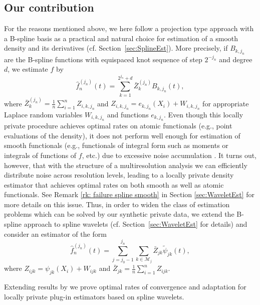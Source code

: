\documentclass[preprint]{imsart}
\numberwithin{equation}{section}
\begin{document}
\subsection{Our contribution}

For the reasons mentioned above, we here follow a projection type approach with a B-spline basis as a practical and natural choice for estimation of a smooth density and its derivatives (cf. Section~\ref{sec:SplineEst}). More precisely, if $B_{k,j_n}$ are the B-spline functions with equispaced knot sequence of step $2^{-j_n}$ and degree $d$, we estimate $f$ by
\begin{equation}\label{eq:B-splineEst}
\hat{f}_n^{(j_n)}(t) = \sum_{k=1}^{2^{j_n}+d} \bar{Z}_k^{(j_n)} B_{k,j_n}(t),
\end{equation}
where $\bar{Z}_k^{(j_n)} = \frac1n\sum_{i=1}^n Z_{i,k,j_n}$ and $Z_{i,k,j_n} = e_{k,j_n}(X_i) + W_{i,k,j_n}$ for appropriate Laplace random variables $W_{i,k,j_n}$ and functions $e_{k,j_n}$. Even though this locally private procedure achieves optimal rates on atomic functionals (e.g., point evaluations of the density), it does not perform well enough for estimation of smooth functionals (e.g., functionals of integral form such as moments or integrals of functions of $f$, etc.) due to excessive noise accumulation \citep[the latter was also observed by][Section~5.2.2., who proposed a more refined noise addition scheme to fix the problem at least for density estimation in $L^2$]{Duchi17}. It turns out, however, that with the structure of a multiresolution analysis we can efficiently distribute noise across resolution levels, leading to a locally private density estimator that achieves optimal rates on both smooth as well as atomic functionals. See Remark \ref{rk: failure spline smooth} in Section \ref{sec:WaveletEst} for more details on this issue. Thus, in order to widen the class of estimation problems which can be solved by our synthetic private data, we extend the B-spline approach to spline wavelets \citep{jia2006stable} (cf. Section~\ref{sec:WaveletEst} for details) and consider an estimator of the form
\begin{equation}\label{eq:waveletEst}
    \hat{f}_n^{(j_n)}(t) = \sum_{j=j_0-1}^{j_n}\sum_{k\in\mathcal M_j} \bar{Z}_{jk} \tilde{\psi}_{jk}(t),
\end{equation}
where $Z_{ijk} = \psi_{jk}(X_i) + W_{ijk}$ and $\bar{Z}_{jk} = \frac1n\sum_{i=1}^n Z_{ijk}$.

Extending results by \citet{GoldsteinMesser92} we prove optimal rates of convergence and adaptation for locally private plug-in estimators based on spline wavelets. 
\end{document}
